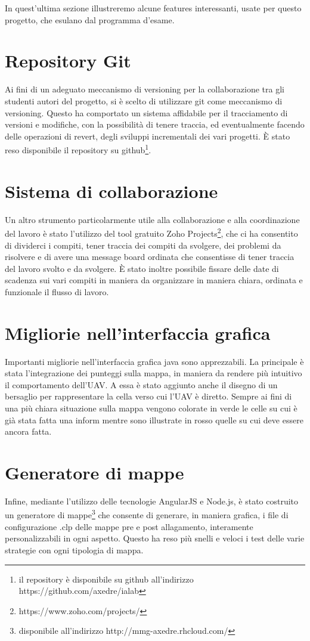 In quest'ultima sezione illustreremo alcune features interessanti, usate per questo progetto, che esulano dal programma d'esame.
\section{Repository Git} \label{sec:repo}
Ai fini di un adeguato meccanismo di versioning per la collaborazione tra gli studenti autori del progetto, si è scelto di utilizzare git come meccanismo di versioning. Questo ha comportato un sistema affidabile per il tracciamento di versioni e modifiche, con la possibilità di tenere traccia, ed eventualmente facendo delle operazioni di revert, degli sviluppi incrementali dei vari progetti. È stato reso disponibile il repository su github\footnote{il repository è disponibile su github all'indirizzo https://github.com/axedre/ialab}.

\section{Sistema di collaborazione} \label{sec:collaborazione}
Un altro strumento particolarmente utile alla collaborazione e alla coordinazione del lavoro è stato l'utilizzo del tool gratuito Zoho Projects\footnote{https://www.zoho.com/projects/}, che ci ha consentito di dividerci i compiti, tener traccia dei compiti da svolgere, dei problemi da risolvere e di avere una message board ordinata che consentisse di tener traccia del lavoro svolto e da svolgere.
È stato inoltre possibile fissare delle date di scadenza sui vari compiti in maniera da organizzare in maniera chiara, ordinata e funzionale il flusso di lavoro.

\section{Migliorie nell'interfaccia grafica} \label{sec:grafica}
Importanti migliorie nell'interfaccia grafica java sono apprezzabili. La principale è stata l'integrazione dei punteggi sulla mappa, in maniera da rendere più intuitivo il comportamento dell'UAV. A essa è stato aggiunto anche il disegno di un bersaglio per rappresentare la cella verso cui l'UAV è diretto.
Sempre ai fini di una più chiara situazione sulla mappa vengono colorate in verde le celle su cui è già stata fatta una inform mentre sono illustrate in rosso quelle su cui deve essere ancora fatta.

\section{Generatore di mappe} \label{sec:generatore}
Infine, mediante l'utilizzo delle tecnologie AngularJS e Node.js, è stato costruito un generatore di mappe\footnote{disponibile all'indirizzo http://mmg-axedre.rhcloud.com/} che consente di generare, in maniera grafica, i file di configurazione .clp delle mappe pre e post allagamento, interamente personalizzabili in ogni aspetto. Questo ha reso più snelli e veloci i test delle varie strategie con ogni tipologia di mappa.
